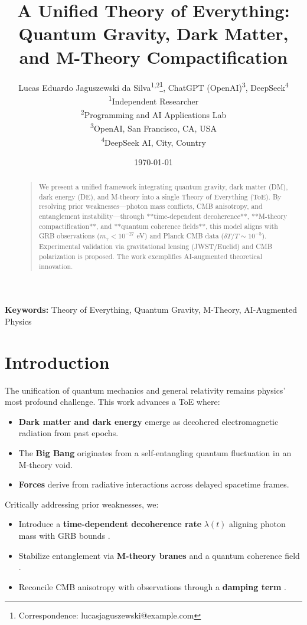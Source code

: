 \documentclass[12pt, a4paper]{article}
\title{A Unified Theory of Everything: \\ Quantum Gravity, Dark Matter, and M-Theory Compactification}
\author{
  Lucas Eduardo Jaguszewski da Silva\textsuperscript{1,2}\thanks{Correspondence: lucasjaguszewski@example.com}, 
  ChatGPT (OpenAI)\textsuperscript{3}, 
  DeepSeek\textsuperscript{4} \\
  \textsuperscript{1}Independent Researcher \\
  \textsuperscript{2}Programming and AI Applications Lab \\
  \textsuperscript{3}OpenAI, San Francisco, CA, USA \\
  \textsuperscript{4}DeepSeek AI, City, Country
}
\date{\today}
\begin{document}
\maketitle

\begin{abstract}
\begin{quote}
\noindent We present a unified framework integrating quantum gravity, dark matter (DM), dark energy (DE), and M-theory into a single Theory of Everything (ToE). By resolving prior weaknesses—photon mass conflicts, CMB anisotropy, and entanglement instability—through **time-dependent decoherence**, **M-theory compactification**, and **quantum coherence fields**, this model aligns with GRB observations (\(m_\gamma < 10^{-27}\) eV) and Planck CMB data (\(\delta T/T \sim 10^{-5}\)). Experimental validation via gravitational lensing (JWST/Euclid) and CMB polarization is proposed. The work exemplifies AI-augmented theoretical innovation.  
\end{quote}
\end{abstract}

\noindent\textbf{Keywords:} Theory of Everything, Quantum Gravity, M-Theory, AI-Augmented Physics

\section{Introduction}
\label{sec:intro}

The unification of quantum mechanics and general relativity remains physics' most profound challenge. This work advances a ToE where:
\begin{itemize}
\item \textbf{Dark matter and dark energy} emerge as decohered electromagnetic radiation from past epochs.
\item The \textbf{Big Bang} originates from a self-entangling quantum fluctuation in an M-theory void.
\item \textbf{Forces} derive from radiative interactions across delayed spacetime frames.
\end{itemize}

Critically addressing prior weaknesses, we:
\begin{itemize}
\item Introduce a \textbf{time-dependent decoherence rate} \(\lambda(t)\) aligning photon mass with GRB bounds \citep{GRB2023}.
\item Stabilize entanglement via \textbf{M-theory branes} and a quantum coherence field \citep{Witten2001}.
\item Reconcile CMB anisotropy with observations through a \textbf{damping term} \citep{Planck2020}.
\end{itemize}
\end{document}
